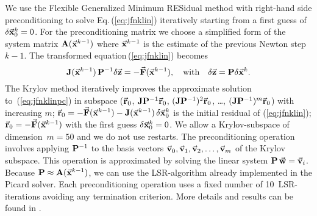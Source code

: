 We use the Flexible Generalized Minimum RESidual method
\citep[FGMRES,][]{saad93:_fgmres} with right-hand side preconditioning
to solve Eq.\,(\ref{eq:jfnklin}) iteratively starting from a first
guess of $\delta\vec{\mathbf{x}}^{k}_{0} = 0$. For the preconditioning matrix
 we choose a simplified form of the system matrix
$\mathbf{A}(\vec{\mathbf{x}}^{k-1})$ \citep{lemieux10} where $\vec{\mathbf{x}}^{k-1}$ is
the estimate of the previous Newton step $k-1$. The transformed
equation\,(\ref{eq:jfnklin}) becomes
\begin{equation}
  \label{eq:jfnklinpc}
  \mat{J}(\vek{x}^{k-1})\,\mat{P}^{-1}\delta\vek{z} =
  -\vek{F}(\vek{x}^{k-1}), 
  \quad\text{with}\quad \delta\vek{z}=\mat{P}\delta\vek{x}^{k}.
\end{equation}
The Krylov method iteratively improves the approximate solution
to~(\ref{eq:jfnklinpc}) in subspace ($\vec{\mathbf{r}}_0$,
$\mathbf{J}\mathbf{P}^{-1}\vec{\mathbf{r}}_0$, $(\mathbf{J}\mathbf{P}^{-1})^2\vec{\mathbf{r}}_0$,
\ldots, $(\mathbf{J}\mathbf{P}^{-1})^m\vec{\mathbf{r}}_0$) with increasing $m$;
$\vec{\mathbf{r}}_0 = -\vec{\mathbf{F}}(\vec{\mathbf{x}}^{k-1})
-\mathbf{J}(\vec{\mathbf{x}}^{k-1})\,\delta\vec{\mathbf{x}}^{k}_{0}$
is the initial residual of
(\ref{eq:jfnklin}); $\vec{\mathbf{r}}_0=-\vec{\mathbf{F}}(\vec{\mathbf{x}}^{k-1})$ with the first
guess $\delta\vec{\mathbf{x}}^{k}_{0}=0$. We allow a Krylov-subspace of
dimension~$m=50$ and we do not use restarts. The preconditioning operation
involves applying $\mathbf{P}^{-1}$ to the basis vectors $\vec{\mathbf{v}}_0,
\vec{\mathbf{v}}_1, \vec{\mathbf{v}}_2, \ldots, \vec{\mathbf{v}}_m$ of the Krylov subspace. This
operation is approximated by solving the linear system
$\mathbf{P}\,\vec{\mathbf{w}}=\vec{\mathbf{v}}_i$. Because $\mathbf{P} \approx
\mathbf{A}(\vec{\mathbf{x}}^{k-1})$, we can use the LSR-algorithm \citep{zhang97}
already implemented in the Picard solver. Each preconditioning
operation uses a fixed number of 10~LSR-iterations avoiding any
termination criterion. More details and results can be found in
\citet{lemieux10, losch14:_jfnk}.

